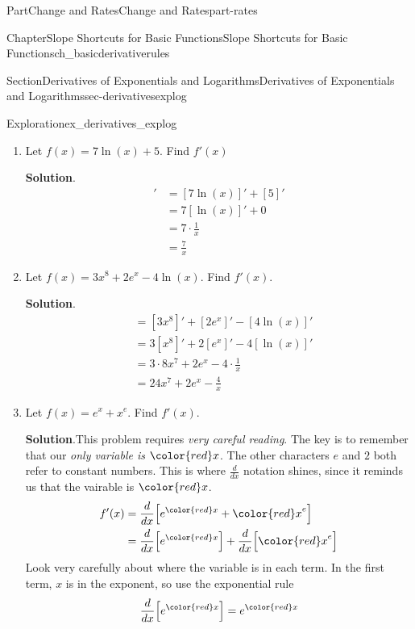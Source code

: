 \documentclass[oneside,10pt,]{tufte-book}
\newcommand{\blocktitlefont}{\relax}
\numberwithin{equation}{chapter}
\newcommand{\red}[1]{   {\color{red}   #1}   }
\newcommand{\ddx}[1]{ \dfrac{d}{dx} \Big[ #1 \Big]  }
\newcommand{\amp}{&}
\begin{document}
\begin{partptx}{Part}{Change and Rates}{}{Change and Rates}{}{}{part-rates}
\begin{chapterptx}{Chapter}{Slope Shortcuts for Basic Functions}{}{Slope Shortcuts for Basic Functions}{}{}{ch_basicderivativerules}
\begin{sectionptx}{Section}{Derivatives of Exponentials and Logarithms}{}{Derivatives of Exponentials and Logarithms}{}{}{sec-derivativesexplog}
\begin{exploration}{Exploration}{}{ex_derivatives_explog}
\begin{enumerate}[font=\bfseries,label=(\alph*),ref=\alph*]
\noindent\textbf{\blocktitlefont Solution}.\hypertarget{ex_derivatives_explog-1-2}{}\quad{}%
\begin{align*}
[12e^x - 2]'  \amp = [12e^x]' - [2]'\\
\amp = 12 [e^x]' - 0\\
\amp 12 e^x
\end{align*}
%
\item{}Let \(f(x) = 7\ln(x) + 5\).  Find \(f'(x)\)%
\par\smallskip%
\noindent\textbf{\blocktitlefont Solution}.\hypertarget{ex_derivatives_explog-2-2}{}\quad{}%
\begin{align*}
[7\ln(x) +5]'\amp = [7\ln(x)]' + [5]' \\
\amp =  7[\ln(x)]' + 0 \\
\amp = 7\cdot \frac{1}{x} \\
\amp = \frac{7}{x}
\end{align*}
%
\item{}Let \(f(x) = 3x^8 + 2e^x - 4\ln(x)\).  Find \(f'(x)\).%
\par\smallskip%
\noindent\textbf{\blocktitlefont Solution}.\hypertarget{ex_derivatives_explog-3-2}{}\quad{}%
\begin{align*}
[3x^8 + 2e^x - 4\ln(x)] \amp = [3x^8]' + [2e^x]' - [4\ln(x)]' \\
\amp  = 3[x^8]' + 2[e^x]' - 4[\ln(x)]'\\
\amp = 3\cdot 8x^7 + 2e^x - 4\cdot \frac{1}{x}\\
\amp = 24 x^7 + 2e^x - \frac{4}{x}
\end{align*}
%
\item{}Let \(f(x) = e^x + x^e \).  Find \(f'(x)\).%
\par\smallskip%
\noindent\textbf{\blocktitlefont Solution}.\hypertarget{ex_derivatives_explog-4-2}{}\quad{}This problem requires \emph{very careful reading}. The key is to remember that our \emph{only variable is \(\red x\)}.  The other characters \(e\) and \(2\) both refer to constant numbers. This is where \(\frac{d}{dx}\) notation shines, since it reminds us that the vairable is \(\red x\).%
\begin{align*}
f'(x) \amp = \ddx{ e^{\red x} + {\red x}^e} \\
\amp = \ddx{e^{\red x}} + \ddx{{\red x}^e}  
\end{align*}
Look very carefully about where the variable is in each term.  In the first term, \(x\) is in the exponent, so use the exponential rule%
\begin{equation*}
\ddx{e^{\red x}} = e^{\red x}

\end{equation*}
\end{enumerate}
\end{exploration}
\end{sectionptx}
\end{chapterptx}
\end{partptx}
\end{document}
